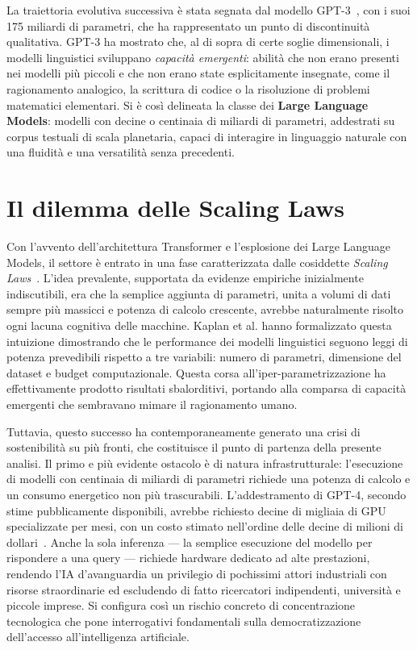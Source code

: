 La traiettoria evolutiva successiva è stata segnata dal modello GPT-3~\cite{brown2020language}, con i suoi 175 miliardi di parametri, che ha rappresentato un punto di discontinuità qualitativa. GPT-3 ha mostrato che, al di sopra di certe soglie dimensionali, i modelli linguistici sviluppano \textit{capacità emergenti}: abilità che non erano presenti nei modelli più piccoli e che non erano state esplicitamente insegnate, come il ragionamento analogico, la scrittura di codice o la risoluzione di problemi matematici elementari. Si è così delineata la classe dei \textbf{Large Language Models}: modelli con decine o centinaia di miliardi di parametri, addestrati su corpus testuali di scala planetaria, capaci di interagire in linguaggio naturale con una fluidità e una versatilità senza precedenti.

\section{Il dilemma delle Scaling Laws}
\label{sec:scaling}

Con l'avvento dell'architettura Transformer e l'esplosione dei Large Language Models, il settore è entrato in una fase caratterizzata dalle cosiddette \textit{Scaling Laws}~\cite{kaplan2020scaling}. L'idea prevalente, supportata da evidenze empiriche inizialmente indiscutibili, era che la semplice aggiunta di parametri, unita a volumi di dati sempre più massicci e potenza di calcolo crescente, avrebbe naturalmente risolto ogni lacuna cognitiva delle macchine. Kaplan et al. hanno formalizzato questa intuizione dimostrando che le performance dei modelli linguistici seguono leggi di potenza prevedibili rispetto a tre variabili: numero di parametri, dimensione del dataset e budget computazionale. Questa corsa all'iper-parametrizzazione ha effettivamente prodotto risultati sbalorditivi, portando alla comparsa di capacità emergenti che sembravano mimare il ragionamento umano.

Tuttavia, questo successo ha contemporaneamente generato una crisi di sostenibilità su più fronti, che costituisce il punto di partenza della presente analisi. Il primo e più evidente ostacolo è di natura infrastrutturale: l'esecuzione di modelli con centinaia di miliardi di parametri richiede una potenza di calcolo e un consumo energetico non più trascurabili. L'addestramento di GPT-4, secondo stime pubblicamente disponibili, avrebbe richiesto decine di migliaia di GPU specializzate per mesi, con un costo stimato nell'ordine delle decine di milioni di dollari~\cite{patel2023gpt4}. Anche la sola inferenza — la semplice esecuzione del modello per rispondere a una query — richiede hardware dedicato ad alte prestazioni, rendendo l'IA d'avanguardia un privilegio di pochissimi attori industriali con risorse straordinarie ed escludendo di fatto ricercatori indipendenti, università e piccole imprese. Si configura così un rischio concreto di concentrazione tecnologica che pone interrogativi fondamentali sulla democratizzazione dell'accesso all'intelligenza artificiale.

